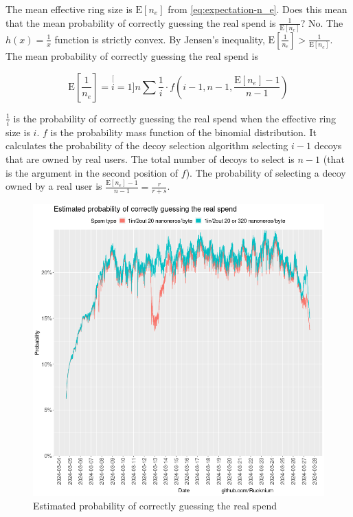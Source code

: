 \documentclass[usletter,11pt,english,openany]{article}
\begin{document}
The mean effective ring size is $\mathrm{E}\left[n_{e}\right]$ from
\ref{eq:expectation-n_e}. Does this mean that the mean probability
of correctly guessing the real spend is $\frac{1}{\mathrm{E}\left[n_{e}\right]}$?
No. The $h(x)=\frac{1}{x}$ function is strictly convex. By Jensen's
inequality, $\mathrm{E}\left[\frac{1}{n_{e}}\right]>\frac{1}{\mathrm{E}\left[n_{e}\right]}$.
The mean probability of correctly guessing the real spend is

\begin{equation}
\mathrm{E}\left[\frac{1}{n_{e}}\right]=\stackrel[i=1]{n}{\sum}\dfrac{1}{i}\cdot f(i-1,n-1,\frac{\mathrm{E}\left[n_{e}\right]-1}{n-1})
\end{equation}

$\frac{1}{i}$ is the probability of correctly guessing the real spend
when the effective ring size is $i$. $f$ is the probability mass
function of the binomial distribution. It calculates the probability
of the decoy selection algorithm selecting $i-1$ decoys that are
owned by real users. The total number of decoys to select is $n-1$
(that is the argument in the second position of $f$). The probability
of selecting a decoy owned by a real user is $\frac{\mathrm{E}\left[n_{e}\right]-1}{n-1}=\frac{r}{r+s}$.

\begin{figure}[H]
\caption{Estimated probability of correctly guessing the real spend}
\label{fig-prob-guessing-real-spend}
\centering{}\includegraphics[scale=0.5]{images/empirical-guessing-probability}
\end{figure}
\end{document}
